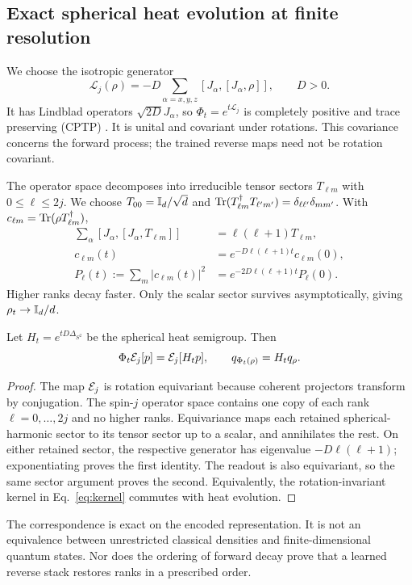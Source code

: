 \subsection{Exact spherical heat evolution at finite resolution}
We choose the isotropic generator
\begin{equation}
 \mathcal L_j(\rho)=-D\sum_{\alpha=x,y,z}[J_\alpha,[J_\alpha,\rho]],\qquad D>0.
 \label{eq:lindblad}
\end{equation}
It has Lindblad operators $\sqrt{2D}J_\alpha$, so $\Phi_t=e^{t\mathcal L_j}$ is completely positive and trace preserving (CPTP) \citep{lindblad1976}. It is unital and covariant under rotations. This covariance concerns the forward process; the trained reverse maps need not be rotation covariant.

The operator space decomposes into irreducible tensor sectors $T_{\ell m}$ with $0\leq\ell\leq2j$. We choose $T_{00}=\mathbb{I}_d/\sqrt d$ and $\operatorname{Tr}(T_{\ell m}^\dagger T_{\ell' m'})=\delta_{\ell\ell'}\delta_{mm'}$. With $c_{\ell m}=\operatorname{Tr}(\rho T_{\ell m}^\dagger)$,
\begin{align}
 \sum_\alpha[J_\alpha,[J_\alpha,T_{\ell m}]]&=\ell(\ell+1)T_{\ell m},\nonumber\\
 c_{\ell m}(t)&=e^{-D\ell(\ell+1)t}c_{\ell m}(0),\label{eq:decay}\\
 P_\ell(t):=\sum_m|c_{\ell m}(t)|^2&=e^{-2D\ell(\ell+1)t}P_\ell(0).\nonumber
\end{align}
Higher ranks decay faster. Only the scalar sector survives asymptotically, giving $\rho_t\to\mathbb{I}_d/d$.

\begin{proposition}
Let $H_t=e^{tD\Delta_{S^2}}$ be the spherical heat semigroup. Then
\begin{equation}
 \Phi_t\mathcal{E}_j[p]=\mathcal{E}_j[H_t p],\qquad
 q_{\Phi_t(\rho)}=H_tq_\rho.
 \label{eq:intertwine}
\end{equation}
\end{proposition}
\begin{proof}
The map $\mathcal{E}_j$ is rotation equivariant because coherent projectors transform by conjugation. The spin-$j$ operator space contains one copy of each rank $\ell=0,\ldots,2j$ and no higher ranks. Equivariance maps each retained spherical-harmonic sector to its tensor sector up to a scalar, and annihilates the rest. On either retained sector, the respective generator has eigenvalue $-D\ell(\ell+1)$; exponentiating proves the first identity. The readout is also equivariant, so the same sector argument proves the second. Equivalently, the rotation-invariant kernel in Eq.~\eqref{eq:kernel} commutes with heat evolution.
\end{proof}
The correspondence is exact on the encoded representation. It is not an equivalence between unrestricted classical densities and finite-dimensional quantum states. Nor does the ordering of forward decay prove that a learned reverse stack restores ranks in a prescribed order.

